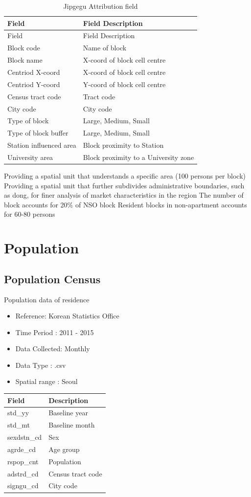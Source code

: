 \documentclass[]{book}
\providecommand{\tightlist}{%
  \setlength{\itemsep}{0pt}\setlength{\parskip}{0pt}}
\begin{document}
\begin{longtable}[]{@{}ll@{}}
\caption{\label{tab:foo} Jipgegu Attribution field}\tabularnewline
\toprule
Field & Field Description\tabularnewline
\midrule
\endfirsthead
\toprule
Field & Field Description\tabularnewline
\midrule
\endhead
Block code & Name of block\tabularnewline
Block name & X-coord of block cell centre\tabularnewline
Centriod X-coord & X-coord of block cell centre\tabularnewline
Centriod Y-coord & Y-coord of block cell centre\tabularnewline
Census tract code & Tract code\tabularnewline
City code & City code\tabularnewline
Type of block & Large, Medium, Small\tabularnewline
Type of block buffer & Large, Medium, Small\tabularnewline
Station influenced area & Block proximity to Station\tabularnewline
University area & Block proximity to a University zone\tabularnewline
\bottomrule
\end{longtable}

Providing a spatial unit that understands a specific area (100 persons
per block) Providing a spatial unit that further subdivides
administrative boundaries, such as dong, for finer analysis of market
characteristics in the region The number of block accounts for 20\% of
NSO block Resident blocks in non-apartment accounts for 60-80 persons

\chapter{Population}\label{population}

\section{Population Census}\label{population-census}

Population data of residence

\begin{itemize}
\tightlist
\item
  Reference: Korean Statistics Office
\item
  Time Period : 2011 - 2015
\item
  Data Collected: Monthly
\item
  Data Type : .csv
\item
  Spatial range : Seoul 
\end{itemize}

\begin{longtable}[]{@{}ll@{}}
\toprule
Field & Description\tabularnewline
\midrule
\endhead
std\_yy & Baseline year\tabularnewline
std\_mt & Baseline month\tabularnewline
sexdstn\_cd & Sex\tabularnewline
agrde\_cd & Age group\tabularnewline
rspop\_cnt & Population\tabularnewline
adstrd\_cd & Census tract code\tabularnewline
signgu\_cd & City code\tabularnewline
\bottomrule
\end{longtable}
\end{document}
